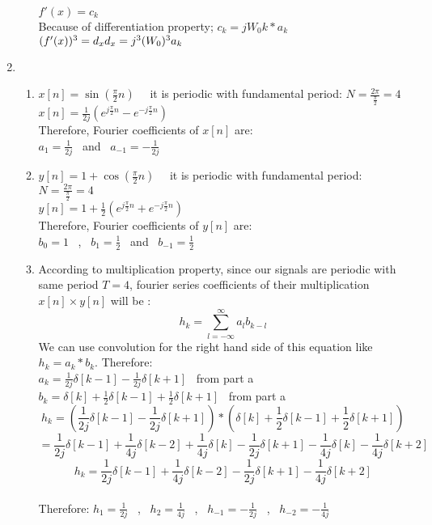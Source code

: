 \documentclass[10pt,a4paper, margin=1in]{article}
\begin{document}
\begin{enumerate}
\begin{enumerate}
        $f'(x) = c_k $
    \\
    Because of differentiation property;
    $c_k = j W_0 k * a_k$
    \\
    $(f'(x))^3 = d_x 
    \\
    d_x = j^3 (W_0)^3 a_k $
    \end{enumerate}

\item %
    \begin{enumerate}
    \item %
    $x[n] = \sin(\frac{\pi}{2}n)$ \ \ it is periodic with fundamental period: $N = \frac{2\pi}{\frac{\pi}{2}} = 4$ \\
    $x[n] = \frac{1}{2j}(e^{j\frac{\pi}{2}n} - e^{-j\frac{\pi}{2}n})$ \\
    Therefore, Fourier coefficients of $x[n]$ are: \\
    $a_1 = \frac{1}{2j}$ \ and \ $a_{-1} = -\frac{1}{2j}$ \\
    \item %
    $y[n] = 1+ \cos(\frac{\pi}{2}n)$ \ \ it is periodic with fundamental period: $N = \frac{2\pi}{\frac{\pi}{2}} = 4$ \\
    $y[n] = 1+ \frac{1}{2}(e^{j\frac{\pi}{2}n} + e^{-j\frac{\pi}{2}n})$ \\
    Therefore, Fourier coefficients of $y[n]$ are: \\
    $b_0 = 1$ \ , \ $b_1 = \frac{1}{2}$ \ and \ $b_{-1} =\frac{1}{2}$ \\
    
    \item %
    According to multiplication property, since our signals are periodic with same period $T = 4$, fourier series coefficients of their multiplication $x[n] \times y[n]$ will be : \\
    \[ h_k = \sum_{l=-\infty}^{\infty} a_lb_{k-l} \]
    We can use convolution for the right hand side of this equation like $h_k = a_k * b_k$. Therefore: \\
    $a_k = \frac{1}{2j} \delta[k-1] - \frac{1}{2j} \delta[k+1] $  \ from part a \\
     $b_k = \delta[k] + \frac{1}{2} \delta[k-1] + \frac{1}{2} \delta[k+1] $  \ from part a \\
     \[ h_k = (\frac{1}{2j} \delta[k-1] - \frac{1}{2j} \delta[k+1]) * (\delta[k] + \frac{1}{2} \delta[k-1] + \frac{1}{2} \delta[k+1]) \]
     \[ = \frac{1}{2j} \delta[k-1] + \frac{1}{4j} \delta[k-2] + \frac{1}{4j} \delta[k] - \frac{1}{2j} \delta[k+1] - \frac{1}{4j} \delta[k] - \frac{1}{4j} \delta[k+2] \]
     \[h_k = \frac{1}{2j} \delta[k-1] + \frac{1}{4j} \delta[k-2] - \frac{1}{2j} \delta[k+1] - \frac{1}{4j} \delta[k+2] \] \\
     Therefore: $h_1 = \frac{1}{2j}$ \ , \ $h_2 = \frac{1}{4j}$ \ , \ $h_{-1} = - \frac{1}{2j}$ \ , \ $h_{-2} = - \frac{1}{4j}$
         

\end{enumerate}
\end{enumerate}
\end{document}
